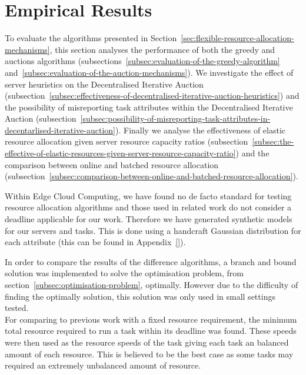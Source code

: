\section{Empirical Results}
\label{sec:empirical-results}
To evaluate the algorithms presented in Section~\ref{sec:flexible-resource-allocation-mechanisms},
this section analyses the performance of both the greedy and auctions algorithms
(subsections~\ref{subsec:evaluation-of-the-greedy-algorithm} and~\ref{subsec:evaluation-of-the-auction-mechanisms}).
We investigate the effect of server heuristics on the Decentralised Iterative Auction
(subsection~\ref{subsec:effectiveness-of-decentralised-iterative-auction-heuristics}) and
the possibility of misreporting task attributes within the Decentralised Iterative Auction
(subsection~\ref{subsec:possibility-of-misreporting-task-attributes-in-decentarlised-iterative-auction}).
Finally we analyse the effectiveness of elastic resource allocation given server resource capacity ratios
(subsection~\ref{subsec:the-effective-of-elastic-resources-given-server-resource-capacity-ratio})
and the comparison between online and batched resource allocation
(subsection~\ref{subsec:comparison-between-online-and-batched-resource-allocation}).

Within Edge Cloud Computing, we have found no de facto standard for testing resource allocation algorithms and
those used in related work do not consider a deadline applicable for our work. Therefore we have generated synthetic
models for our servers and tasks. This is done using a handcraft Gaussian distribution for each attribute (this can be
found in Appendix~\ref{}). %

In order to compare the results of the difference algorithms, a branch and bound solution was implemented to solve
the optimisation problem, from section~\ref{subsec:optimisation-problem}, optimally. However due to the difficulty of
finding the optimally solution, this solution was only used in small settings tested. \\
For comparing to previous work with a fixed resource requirement, the minimum total resource required to run a task
within its deadline was found. These speeds were then used as the resource speeds of the task giving each task an
balanced amount of each resource. This is believed to be the best case as some tasks may required an extremely
unbalanced amount of resource.

